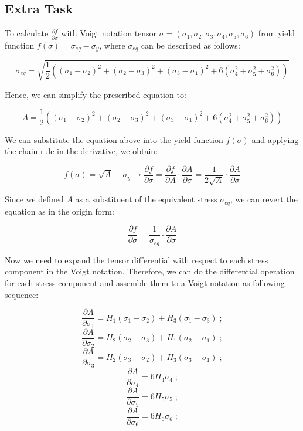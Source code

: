 \documentclass[12pt]{article}
\begin{document}
\subsection*{Extra Task}
To calculate $\frac{\partial{f}}{\partial{\sigma}}$ with Voigt notation tensor $\sigma = (\sigma_1, \sigma_2, \sigma_3, \sigma_4, \sigma_5, \sigma_6)$ from yield function 
$f(\sigma)=\sigma_{eq} - \sigma_y$, where $\sigma_{eq}$ can be described as follows:

\begin{equation}
\sigma_{eq} = \sqrt{\frac{1}{2} \left( (\sigma_1 - \sigma_2)^2 + (\sigma_2 - \sigma_3)^2 + (\sigma_3 - \sigma_1)^2 + 6(\sigma_4^2 + \sigma_5^2 + \sigma_6^2) \right)}
\end{equation}

Hence, we can simplify the prescribed equation to:

\begin{equation}
A = \frac{1}{2} \left( (\sigma_1 - \sigma_2)^2 + (\sigma_2 - \sigma_3)^2 + (\sigma_3 - \sigma_1)^2 + 6(\sigma_4^2 + \sigma_5^2 + \sigma_6^2) \right)
\end{equation}

We can substitute the equation above into the yield function $f(\sigma)$ and applying the chain rule in the 
derivative, we obtain:

\begin{equation}
f(\sigma) = \sqrt{A} - \sigma_y \rightarrow \frac{\partial{f}}{\partial{\sigma}} = \frac{\partial{f}}{\partial{A}} \cdot \frac{\partial{A}}{\partial{\sigma}} = \frac{1}{2\sqrt{A}} \cdot \frac{\partial{A}}{\partial{\sigma}}
\end{equation}

Since we defined $A$ as a substituent of the equivalent stress $\sigma_{eq}$, we can revert the equation as in the origin form:

\begin{equation}
    \frac{\partial{f}}{\partial{\sigma}} = \frac{1}{\sigma_{eq}} \cdot \frac{\partial{A}}{\partial{\sigma}}
\end{equation}

Now we need to expand the tensor differential with respect to each stress component in 
the Voigt notation. Therefore, we can do the differential operation for each stress 
component and assemble them to a Voigt notation as following sequence:

\[
\frac{\partial{A}}{\partial{\sigma_1}} = H_{1}(\sigma_1-\sigma_2) + H_3(\sigma_1-\sigma_3) \;;
\]
\[
\frac{\partial{A}}{\partial{\sigma_2}} = H_{2}(\sigma_2-\sigma_3) + H_1(\sigma_2-\sigma_1) \;;
\]
\[
\frac{\partial{A}}{\partial{\sigma_3}} = H_{2}(\sigma_3-\sigma_2) + H_3(\sigma_3-\sigma_1) \;;
\]
\[
\frac{\partial{A}}{\partial{\sigma_4}} = 6H_{4}\sigma_4 \;;
\]
\[
\frac{\partial{A}}{\partial{\sigma_5}} = 6H_{5}\sigma_5 \;;
\]
\[
\frac{\partial{A}}{\partial{\sigma_6}} = 6H_{6}\sigma_6 \;;
\]
\end{document}
